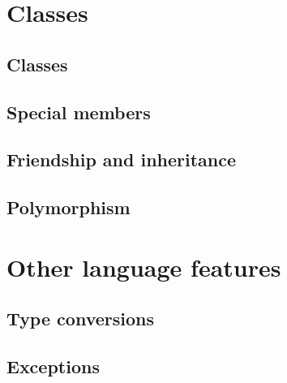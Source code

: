\documentclass{beamer}
\begin{document}
\section{Classes}
\subsection{Classes}
\begin{frame}

\end{frame}

\subsection{Special members}
\begin{frame}

\end{frame}

\subsection{Friendship and inheritance}
\begin{frame}

\end{frame}

\subsection{Polymorphism}
\begin{frame}

\end{frame}


\section{Other language features}
\subsection{Type conversions}
\begin{frame}

\end{frame}

\subsection{Exceptions}
\begin{frame}

\end{frame}
\end{document}

